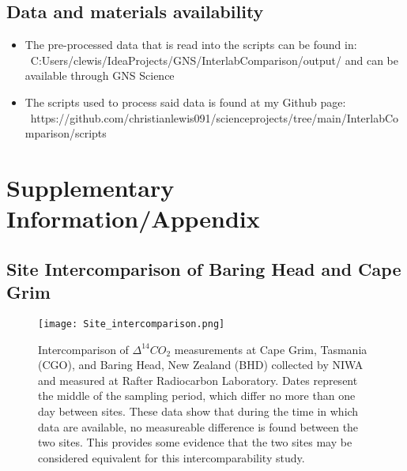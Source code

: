 \documentclass{article}
\begin{document}
\subsection{Data and materials availability}
\begin{itemize}
	\item The pre-processed data that is read into the scripts can be found in: ~\newline C:Users/clewis/IdeaProjects/GNS/InterlabComparison/output/ and can be available through GNS Science
	\item The scripts used to process said data is found at my Github page: ~\newline https://github.com/christianlewis091/scienceprojects/tree/main/InterlabComparison/scripts
\end{itemize}























\newpage
\section{Supplementary Information/Appendix}

\subsection{Site Intercomparison of Baring Head and Cape Grim}


\begin{figure}[htp]
    \centering
    \texttt{[image: Site\_intercomparison.png]}
    \caption{Intercomparison of ${\Delta^{14}CO_{2}}$ measurements  at Cape Grim, Tasmania (CGO), and Baring Head, New Zealand (BHD) collected by NIWA and measured at Rafter Radiocarbon Laboratory. Dates represent the middle of the sampling period, which differ no more than one day between sites. These data show that during the time in which data are available, no measureable difference is found between the two sites. This provides some evidence that the two sites may be considered equivalent for this intercomparability study.}
    \label{fig:bhdvcgo}
\end{figure}

\newpage


\end{document}
